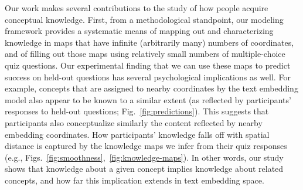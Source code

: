 \documentclass[10pt]{article}
\begin{document}
Our work makes several contributions to the study of how people acquire
conceptual knowledge. First, from a methodological standpoint, our modeling
framework provides a systematic means of mapping out and characterizing
knowledge in maps that have infinite (arbitrarily many) numbers of coordinates,
and of filling out those maps using relatively small numbers of
multiple-choice quiz questions. Our experimental finding that we can use these
maps to predict success on held-out questions has several psychological
implications as well. For example, concepts that are assigned to nearby
coordinates by the text embedding model also appear to be known to a similar
extent (as reflected by participants' responses to held-out questions;
Fig.~\ref{fig:predictions}). This suggests that participants also
conceptualize similarly the content reflected by nearby embedding
coordinates. How participants' knowledge falls off with spatial distance is
captured by the knowledge maps we infer from their quiz responses
(e.g., Figs.~\ref{fig:smoothness},~\ref{fig:knowledge-maps}). In other words,
our study shows that knowledge about a given concept implies knowledge about
related concepts, and how far this implication extends in text embedding space.
\end{document}
